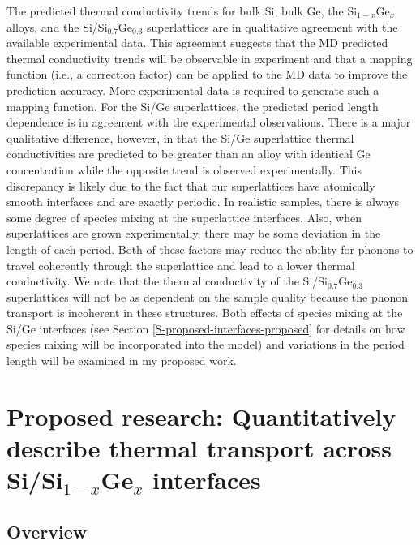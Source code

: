 \documentclass[letterpaper,12pt]{article}
\begin{document}
The predicted thermal conductivity trends for bulk Si, bulk Ge, the
Si$_{1-x}$Ge$_{x}$ alloys, and the Si/Si$_{0.7}$Ge$_{0.3}$
superlattices are in qualitative agreement with the available
experimental data. This agreement suggests that the MD predicted
thermal conductivity trends will be observable in experiment and
that a mapping function (i.e., a correction factor) can be applied
to the MD data to improve the prediction accuracy. More experimental
data is required to generate such a mapping function. For the Si/Ge
superlattices, the predicted period length dependence is in
agreement with the experimental observations. There is a major
qualitative difference, however, in that the Si/Ge superlattice
thermal conductivities are predicted to be greater than an alloy
with identical Ge concentration while the opposite trend is observed
experimentally. This discrepancy is likely due to the fact that our
superlattices have atomically smooth interfaces and are exactly
periodic. In realistic samples, there is always some degree of
species mixing at the superlattice interfaces. Also, when
superlattices are grown experimentally, there may be some deviation
in the length of each period. Both of these factors may reduce the
ability for phonons to travel coherently through the superlattice
and lead to a lower thermal conductivity. We note that the thermal
conductivity of the Si/Si$_{0.7}$Ge$_{0.3}$ superlattices will not
be as dependent on the sample quality because the phonon transport
is incoherent in these structures. Both effects of species mixing at
the Si/Ge interfaces (see Section
\ref{S-proposed-interfaces-proposed} for details on how species
mixing will be incorporated into the model) and variations in the
period length will be examined in my proposed work.

\clearpage

\section{\label{S-ProposedWork-Interfaces}Proposed research: Quantitatively describe thermal transport across Si/Si$_{1-x}$Ge$_x$ interfaces}

\subsection{\label{S-proposed-interfaces-overview}Overview}
\end{document}
